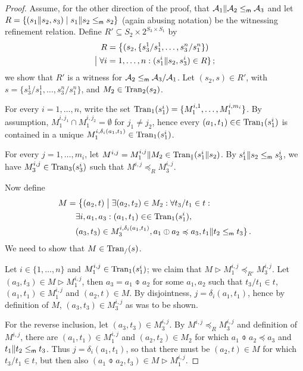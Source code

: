 \documentclass[twocolumn]{svjour3-dummy}
\newcommand*\labpre{\preccurlyeq}
\newcommand*\mr{\le_\textup{\textsf{m}}}
\newcommand*\cA{\mathcal A}
\newcommand*\Tran{\textup{\textrm{Tran}}}
\newcommand*\by{/}
\begin{document}
\begin{proof}
  Assume, for the other direction of the proof, that $\cA_1\| \cA_2\mr
  \cA_3$ and let $R=\{( s_1\| s_2, s_3)\mid s_1\| s_2\mr s_2\}$ (again
  abusing notation) be the witnessing refinement relation.  Define
  $R'\subseteq S_2\times 2^{ S_3\times S_1}$ by
  \begin{multline*}
    R= \big\{( s_2,\{ s_3^1\by s_1^1,\dotsc, s_3^n\by s_1^n\}) \\
    \bigmid \forall i= 1,\dotsc, n:( s_1^i\| s_2, s_3^i)\in R\}\,;
  \end{multline*}
  we show that $R'$ is a witness for $\cA_2\mr \cA_3\by \cA_1$.  Let $(
  s_2, s)\in R'$, with $s=\{ s_3^1\by s_1^1,\dotsc, s_3^n\by s_1^n\}$,
  and $M_2\in \Tran_2( s_2)$.

  For every $i= 1,\dotsc, n$, write the set $\Tran_1( s_1^i)=\{ M_1^{ i,
    1},\dotsc, M_1^{ i, m_i}\}$.  By assumption, $M_1^{ i, j_1}\cap
  M_1^{ i, j_2}= \emptyset$ for $j_1\ne j_2$, hence every $( a_1,
  t_1)\in \in \Tran_1( s_1^i)$ is contained in a unique $M_1^{ i,
    \delta_i( a_1, t_1)}\in \Tran_1( s_1^i)$.

  For every $j= 1,\dotsc, m_i$, let $M^{ i, j}= M_1^{ i, j}\| M_2\in
  \Tran_\|( s_1^i\| s_2)$.  By $s_1^i\| s_2\mr s_3^i$, we have $M_3^{
    i, j}\in \Tran_3( s_3^i)$ such that $M^{ i, j}\labpre_R M_3^{ i, j}$.

  Now define
  \begin{align}
    \notag M &= \big\{ ( a_2, t)\bigmid \exists( a_2, t_2)\in M_2:
    \forall t_3\by t_1\in t: \\
    \label{eq:quotproof.M}
    &\quad \exists i, a_1, a_3:( a_1, t_1)\in \in \Tran_1( s_1^i), \\
    \notag &\quad ( a_3, t_3)\in M_3^{ i, \delta_i( a_1, t_1)}, a_1\obar
    a_2\labpre a_3, t_1\| t_2\mr t_3\}\,.
  \end{align}
  We need to show that $M\in \Tran_\by( s)$.

  Let $i\in\{ 1,\dots, n\}$ and $M_1^{ i, j}\in \Tran_1( s_1^i)$; we
  claim that $M\triangleright M_1^{ i, j}\labpre_{ R'} M_3^{ i, j}$.
  Let $( a_3, t_3)\in M\triangleright M_1^{ i, j}$, then $a_3=
  a_1\obar a_2$ for some $a_1, a_2$ such that $t_3\by t_1\in t$, $(
  a_1, t_1)\in M_1^{ i, j}$ and $( a_2, t)\in M$.  By disjointness,
  $j= \delta_i( a_1, t_1)$, hence by definition of $M$, $( a_3,
  t_3)\in M_3^{ i, j}$ as was to be shown.

  For the reverse inclusion, let $( a_3, t_3)\in M_3^{ i, j}$.  By
  $M^{ i, j}\labpre_R M_3^{ i, j}$ and definition of $M^{ i, j}$,
  there are $( a_1, t_1)\in M_1^{ i, j}$ and $( a_2, t_2)\in M_2$ for
  which $a_1\obar a_2\labpre a_3$ and $t_1\| t_2\mr t_3$.  Thus $j=
  \delta_i( a_1, t_1)$, so that there must be $( a_2, t)\in M$ for
  which $t_3\by t_1\in t$, but then also $( a_1\obar a_2, t_3)\in
  M\triangleright M_1^{ i, j}$.


\end{proof}
\end{document}
